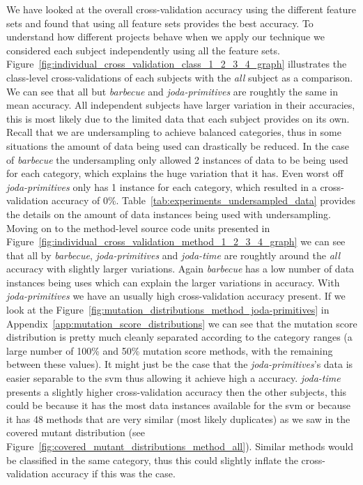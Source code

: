 We have looked at the overall cross-validation accuracy using the different feature sets and found that using all feature sets provides the best accuracy. To understand how different projects behave when we apply our technique we considered each subject independently using all the feature sets. Figure~\ref{fig:individual_cross_validation_class_1_2_3_4_graph} illustrates the class-level cross-validations of each subjects with the \emph{all} subject as a comparison. We can see that all but \emph{barbecue} and \emph{joda-primitives} are roughtly the same in mean accuracy. All independent subjects have larger variation in their accuracies, this is most likely due to the limited data that each subject provides on its own. Recall that we are undersampling to achieve balanced categories, thus in some situations the amount of data being used can drastically be reduced. In the case of \emph{barbecue} the undersampling only allowed 2 instances of data to be being used for each category, which explains the huge variation that it has. Even worst off \emph{joda-primitives} only has 1 instance for each category, which resulted in a cross-validation accuracy of 0\%. Table~\ref{tab:experiments_undersampled_data} provides the details on the amount of data instances being used with undersampling. Moving on to the method-level source code units presented in Figure~\ref{fig:individual_cross_validation_method_1_2_3_4_graph} we can see that all by \emph{barbecue}, \emph{joda-primitives} and \emph{joda-time} are roughtly around the \emph{all} accuracy with slightly larger variations. Again \emph{barbecue} has a low number of data instances being uses which can explain the larger variations in accuracy. With \emph{joda-primitives} we have an usually high cross-validation accuracy present. If we look at the Figure~\ref{fig:mutation_distributions_method_joda-primitives} in Appendix~\ref{app:mutation_score_distributions} we can see that the mutation score distribution is pretty much cleanly separated according to the category ranges (a large number of 100\% and 50\% mutation score methods, with the remaining between these values). It might just be the case that the \emph{joda-primitives}'s data is easier separable to the \gls{svm} thus allowing it achieve high a accuracy. \emph{joda-time} presents a slightly higher cross-validation accuracy then the other subjects, this could be because it has the most data instances available for the \gls{svm} or because it has 48 methods that are very similar (most likely duplicates) as we saw in the covered mutant distribution (see Figure~\ref{fig:covered_mutant_distributions_method_all}). Similar methods would be classified in the same category, thus this could slightly inflate the cross-validation accuracy if this was the case.


